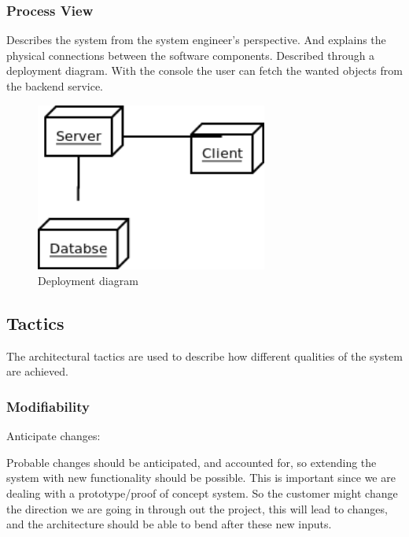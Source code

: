 \subsubsection{Process View}
Describes the system from the system engineer's perspective. And explains the physical connections between the software components. Described through a deployment diagram. 
With the console the user can fetch the wanted objects from the backend service.

\begin{figure}
\centering
\includegraphics[width=3in]{image/deploymentdiagram.png}
\caption{Deployment diagram}
\end{figure}



\subsection{Tactics}
The architectural tactics are used to describe how different qualities of the system are achieved. 

\subsubsection{Modifiability}
Anticipate changes:

Probable changes should be anticipated, and accounted for, so extending the system with new functionality should be possible. This is important since we are dealing with a prototype/proof of concept system. So the customer might change the direction we are going in through out the project, this will lead to changes, and the architecture should be able to bend after these new inputs. 

